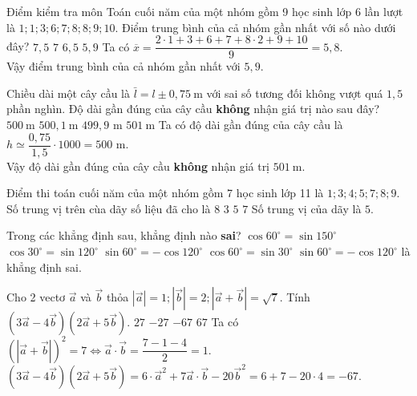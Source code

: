 \begin{ex}%
    Điểm kiểm tra môn Toán cuối năm của một nhóm gồm 9 học sinh lớp 6 lần lượt là $1 ; 1 ; 3 ; 6 ; 7 ; 8 ; 8 ; 9 ; 10$. Điểm trung bình của cả nhóm gần nhất với số nào dưới đây?
    \choice
    {$7{,}5$}
    {$7$}
    {$6{,}5$}
    {\True $5{,}9$}  
    \loigiai
    {
        Ta có $\overline{x}=\dfrac{2\cdot 1+3+6+7+8\cdot 2+9+10}{9}=5{,}8$.\\
        Vậy điểm trung bình của cả nhóm gần nhất với $5{,}9$.
    }
\end{ex}
\begin{ex}%
    Chiều dài một cây cầu là $\bar{l}=l \pm 0,75 \mathrm{~m}$ với sai số tương đối không vượt quá $1{,}5$ phần nghìn. Độ dài gần đúng của cây cầu \textbf{không} nhận giá trị nào sau đây?
    \choice
    {$500 \mathrm{~m}$}
    {$500{,}1 \mathrm{~m}$}
    { $499{,}9 $ m}
    {\True $501 \mathrm{~m}$} 
    \loigiai
    {
        Ta có độ dài gần đúng của cây cầu là $h\simeq\dfrac{0{,75}}{1{,}5}\cdot 1000=500$ m.\\
        Vậy độ dài gần đúng của cây cầu \textbf{không} nhận giá trị $501 \mathrm{~m}$.
    }
\end{ex}
 \begin{ex}%
     Điểm thi toán cuối năm của một nhóm gồm 7 học sinh lớp 11 là $1 ; 3 ; 4 ; 5 ; 7 ; 8 ; 9$. Số trung vị trên cùa dãy số liệu đã cho là
     \choice
     {$8$}
     {$3$}
     {\True $5$}
     {$7$} 
     \loigiai
     {
         Số trung vị của dãy là $5$.
     }
 \end{ex}
 
\begin{ex}%
    Trong các khẳng định sau, khẳng định nào \textbf{sai}?
    \choice
    {$\cos 60^{\circ}=\sin 150^{\circ}$}
    {$\cos 30^{\circ}=\sin 120^{\circ}$}
    {\True $\sin 60^{\circ}=-\cos 120^{\circ}$}
    {$\cos 60^{\circ}=\sin 30^{\circ}$} 
    \loigiai
    {
        $\sin 60^{\circ}=-\cos 120^{\circ}$ là khẳng định sai.
    }
\end{ex}

\begin{ex}%
    Cho 2 vectơ $\vec{a}$ và $\vec{b}$ thỏa $|\vec{a}|=1 ;|\vec{b}|=2 ;|\vec{a}+\vec{b}|=\sqrt{7}$. Tính $(3 \vec{a}-4 \vec{b})(2 \vec{a}+5 \vec{b})$.
    \choice
    {$27$}
    {$-27$}
    {\True $-67$}
    {$67$} 
    \loigiai
    { Ta có $(|\vec{a}+\vec{b}|)^2=7\Leftrightarrow \vec{a}\cdot\vec{b}=\dfrac{7-1-4}{2}=1$.\\
        $(3 \vec{a}-4 \vec{b})(2 \vec{a}+5 \vec{b})=6\cdot \vec{a}^2+7\vec{a}\cdot\vec{b}-20\vec{b}^2=6+7-20\cdot 4=-67$.
    }
\end{ex}

